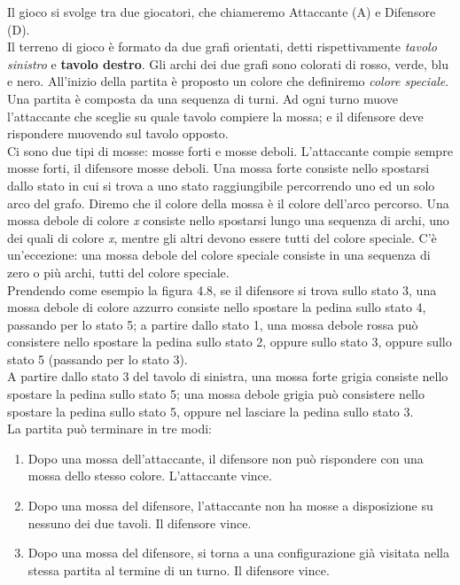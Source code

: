 \documentclass[a4paper,11pt,twoside,openright]{report}
\begin{document}
Il gioco si svolge tra due giocatori, che chiameremo Attaccante (A) e Difensore (D).\\
Il terreno di gioco è formato da due grafi orientati, detti rispettivamente \textit{tavolo sinistro} e \textbf{tavolo destro}. Gli archi dei due grafi sono colorati di rosso, verde, blu e nero. All'inizio della
partita è proposto un colore che definiremo \textit{colore speciale}.\\
Una partita è composta da una sequenza di turni. Ad ogni turno muove l’attaccante che sceglie su quale tavolo compiere la mossa; e il difensore deve rispondere muovendo sul tavolo opposto.\\
Ci sono due tipi di mosse: mosse forti e mosse deboli. L’attaccante compie sempre mosse forti, il difensore mosse deboli. Una mossa forte consiste nello spostarsi dallo stato in cui si trova a uno stato raggiungibile percorrendo uno ed un solo arco del grafo. Diremo che il colore della mossa è il colore dell’arco percorso. Una mossa debole di colore \textit{x} consiste nello spostarsi lungo una sequenza di archi, uno dei quali di colore \textit{x}, mentre gli altri devono essere tutti del colore speciale. C'è un’eccezione: una mossa debole del colore speciale consiste in una sequenza di zero o più archi, tutti del colore speciale.\\
Prendendo come esempio la figura 4.8, se il difensore si trova sullo stato 3, una mossa debole di colore azzurro consiste nello spostare la pedina sullo stato 4, passando
per lo stato 5; a partire dallo stato 1, una mossa debole rossa può consistere nello spostare la pedina sullo stato 2, oppure sullo stato 3, oppure sullo stato 5 (passando
per lo stato 3).\\
A partire dallo stato 3 del tavolo di sinistra, una mossa forte grigia consiste nello spostare la pedina sullo stato 5; una mossa debole grigia può consistere nello spostare
la pedina sullo stato 5, oppure nel lasciare la pedina sullo stato 3.\\

La partita può terminare in tre modi:

\begin{enumerate}
\item Dopo una mossa dell’attaccante, il difensore non può rispondere con una mossa dello stesso colore. L’attaccante vince.

\item Dopo una mossa del difensore, l’attaccante non ha mosse a disposizione su nessuno dei due tavoli. Il difensore vince.

\item Dopo una mossa del difensore, si torna a una configurazione già visitata nella stessa partita al termine di un turno. Il difensore vince.
\end{enumerate}
\end{document}
